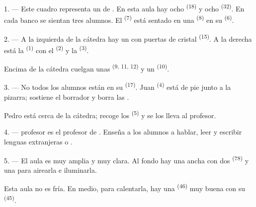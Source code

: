 \VUsaut{2.0mm}
\VUsaut{3.2mm}
\VUsaut{2.6mm}
\VUsaut{3.4mm}
\VUornamento{9pt}
\VUsaut{5.0mm}
\VUsaut{3.0mm}
\VUfilet{16mm}
\VUsaut{5.6mm}

\VUsaut{1.4mm}
\VUsaut{2.2mm}
\VUfilet{20mm}
\VUsaut{6.4mm}

\VUsaut{3.0mm}

1. --- Este cuadro representa un  de . En esta
aula hay ocho  \textsuperscript{(18)} y ocho 
\textsuperscript{(32)}. En cada banco se sientan tres alumnos. El
 \textsuperscript{(7)} está sentado en una 
\textsuperscript{(8)} en su  \textsuperscript{(6)}.

2. --- A la izquierda de la cátedra hay un  con puertas de
cristal \textsuperscript{(15)}. A la derecha está la 
\textsuperscript{(1)} con el  \textsuperscript{(2)} y la 
\textsuperscript{(3)}.

Encima de la cátedra cuelgan unas  \textsuperscript{(9, 11,
12)} y un  \textsuperscript{(10)}.

3. --- No todos los alumnos están en su  \textsuperscript{(17)}. Juan
\textsuperscript{(4)} está de pie junto a la pizarra; sostiene el borrador y borra
las .

Pedro está cerca de la cátedra; recoge los 
\textsuperscript{(5)} y se los lleva al profesor.

4. ---  profesor es el profesor de .
Enseña a los alumnos a hablar, leer y escribir lenguas extranjeras
 o .

5. --- El aula es muy amplia y muy clara. Al fondo hay una 
ancha con dos  \textsuperscript{(78)} y una  para airearla e iluminarla.

Esta aula no es fría. En medio, para calentarla, hay una 
\textsuperscript{(46)} muy buena con su  \textsuperscript{(45)}.

